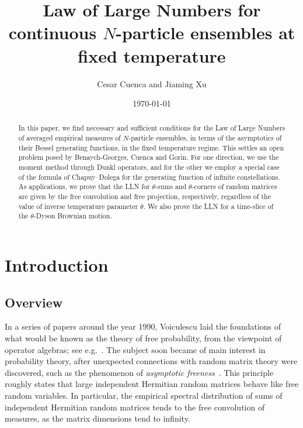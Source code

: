 \documentclass[11pt]{article}
\title{Law of Large Numbers for continuous $N$-particle ensembles at fixed temperature}
\author{Cesar Cuenca and Jiaming Xu}
\date{\today}
\theoremstyle{plain}
\begin{document}
\maketitle

\begin{abstract}
    In this paper, we find necessary and sufficient conditions for the Law of Large Numbers of averaged empirical measures of $N$-particle ensembles, in terms of the asymptotics of their Bessel generating functions, in the fixed temperature regime. This settles an open problem posed by Benaych-Georges, Cuenca and Gorin. For one direction, we use the moment method through Dunkl operators, and for the other we employ a special case of the formula of Chapuy--Dolega for the generating function of infinite constellations. As applications, we prove that the LLN for $\theta$-sums and $\theta$-corners of random matrices are given by the free convolution and free projection, respectively, regardless of the value of inverse temperature parameter $\theta$. We also prove the LLN for a time-slice of the $\theta$-Dyson Brownian motion.
\end{abstract}


\tableofcontents


\section{Introduction}

\subsection{Overview}

In a series of papers around the year 1990, Voiculescu laid the foundations of what would be known as the theory of free probability, from the viewpoint of operator algebras; see e.g.~\cite{Voi86}.
The subject soon became of main interest in probability theory, after unexpected connections with random matrix theory were discovered, such as the phenomenon of \emph{asymptotic freeness}~\cite{Voi91}.
This principle roughly states that large independent Hermitian random matrices behave like free random variables. In particular, the empirical spectral distribution of sums of independent Hermitian random matrices tends to the free convolution of measures, as the matrix dimensions tend to infinity.
\end{document}
